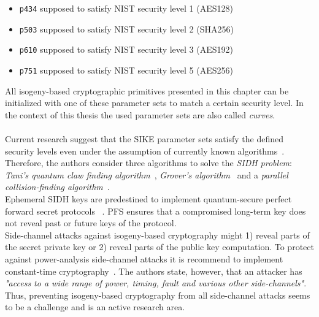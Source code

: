 \begin{itemize}
\itemsep0em 
	\item \texttt{p434} supposed to satisfy \gls{NIST} security level 1 (AES128)
	\item \texttt{p503} supposed to satisfy \gls{NIST} security level 2 (SHA256)
	\item \texttt{p610} supposed to satisfy \gls{NIST} security level 3 (AES192)
	\item \texttt{p751} supposed to satisfy \gls{NIST} security level 5 (AES256)
\end{itemize}
All isogeny-based cryptographic primitives presented in this chapter can be initialized with one of these parameter sets to match a certain security level. In the context of this thesis the used parameter sets are also called \textit{curves}.
\\\\
Current research suggest that the \gls{SIKE} parameter sets satisfy the defined security levels even under the assumption of currently known algorithms~\parencite{jaques2019quantum}. Therefore, the authors consider three algorithms to solve the \textit{\gls{SIDH} problem}: \textit{Tani's quantum claw finding algorithm}~\parencite{tani2009claw}, \textit{Grover's algorithm}~\parencite{grover1996fast} and a \textit{parallel collision-finding algorithm}~\parencite{van1999parallel}.
\\
Ephemeral \gls{SIDH} keys are predestined to implement quantum-secure perfect forward secret protocols ~\parencite{koziel2018high}. \gls{PFS} ensures that a compromised long-term key does not reveal past or future keys of the protocol.
\\
Side-channel attacks against isogeny-based cryptography might 1) reveal parts of the secret private key or 2) reveal parts of the public key computation. To protect against power-analysis side-channel attacks it is recommend to implement constant-time cryptography~\parencite{sike2020spec}. The authors state, however, that an attacker has \textit{"access to a wide range of power, timing, fault and various other side-channels"}. Thus, preventing isogeny-based cryptography from all side-channel attacks seems to be a challenge and is an active research area.
